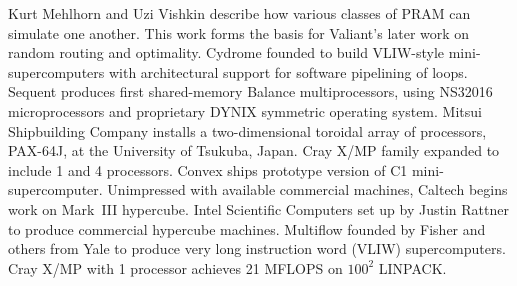 	{Kurt Mehlhorn and Uzi Vishkin describe how various classes of PRAM
	can simulate one another.
	This work forms the basis for Valiant's later work
	on random routing and optimality.}
	{Cydrome founded to build VLIW-style mini-supercomputers
	with architectural support for software pipelining of loops.}
	{Sequent produces first shared-memory Balance multiprocessors,
	using NS32016 microprocessors
	and proprietary DYNIX symmetric operating system.}
	{Mitsui Shipbuilding Company installs a two-dimensional toroidal
	array of processors, PAX-64J,
	at the University of Tsukuba, Japan.}
	{Cray X/MP family expanded to include 1 and 4 processors.}
	{Convex ships prototype version of C1 mini-supercomputer.}
	{Unimpressed with available commercial machines,
	Caltech begins work on Mark~III hypercube.}
	{Intel Scientific Computers set up by Justin Rattner
	to produce commercial hypercube machines.}
	{Multiflow founded by Fisher and others from Yale
	to produce very long instruction word (VLIW) supercomputers.}
	{Cray X/MP with 1 processor achieves 21 MFLOPS
	on $100^2$ LINPACK.}

